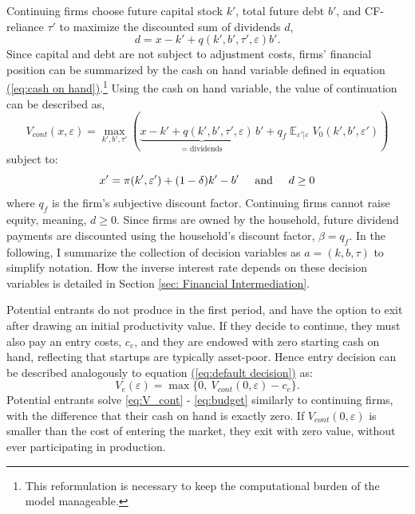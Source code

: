 \documentclass[12pt]{article}
\newcommand{\eref}[1]{\hyperref[#1]{(\ref*{#1})}}
\DeclareMathOperator{\E}{\mathbb{E}}
\begin{document}
Continuing firms choose future capital stock $k'$, total future debt $b'$, and CF-reliance $\tau'$ to maximize the discounted sum of dividends $d$, 
\begin{equation} \label{eq:dividends}
d = x - k' + q(k',b', \tau', \varepsilon) b'.
\end{equation} 
Since capital and debt are not subject to adjustment costs, firms' financial position can be summarized by the cash on hand variable defined in equation \eref{eq:cash on hand}.\footnote{This reformulation is necessary to keep the computational burden of the model manageable.} Using the cash on hand variable, the value of continuation can be described as,
\begin{equation} \label{eq:V_cont}
 V_{cont}(x,\varepsilon) = \max_{k',b', \tau'} \left( \underbrace{x - k' + q(k', b', \tau', \varepsilon)\, b'}_{\text{= dividends}}  + q_f \E_{\varepsilon'|\varepsilon} V_0(k',b', \varepsilon') \right)
\end{equation}
subject to: 
\begin{equation} \label{eq:budget}
x' = \pi(k',\varepsilon')+(1-\delta)k'-b' \hspace{5mm} \text{and} \hspace{5mm} d \geq 0
\end{equation} 
where $q_f$ is the firm's subjective discount factor. Continuing firms cannot raise equity, meaning, $d \geq 0$. Since firms are owned by the household, future dividend payments are discounted using the household's discount factor, $\beta = q_f$. In the following, I summarize the collection of decision variables as $a = (k, b, \tau) $ to simplify notation. How the inverse interest rate depends on these decision variables is detailed in Section \ref{sec: Financial Intermediation}.

Potential entrants do not produce in the first period, and have the option to exit after drawing an initial productivity value. If they decide to continue, they must also pay an entry costs, $c_e$, and they are endowed with zero starting cash on hand, reflecting that startups are typically asset-poor. Hence entry decision can be described analogously to equation \eref{eq:default decision} as: 
\begin{equation} \label{eq:entrant decision}
 V_e(\varepsilon) = \max \{0, \ V_{cont}(0,\varepsilon) - c_e \}.
\end{equation}
Potential entrants solve \ref{eq:V_cont} - \ref{eq:budget} similarly to continuing firms, with the difference that their cash on hand is exactly zero. If $V_{cont}(0,\varepsilon)$ is smaller than the cost of entering the market, they exit with zero value, without ever participating in production.
\end{document}
